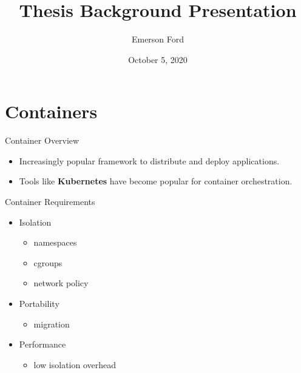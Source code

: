 \documentclass{beamer}
\title{Thesis Background Presentation}
\date{October 5, 2020}
\author{Emerson Ford}
\institute{University of Utah School of Computing}
\begin{document}
\maketitle

\section{Containers}

\begin{frame}{Container Overview}
    \begin{itemize}
        \item Increasingly popular framework to distribute and deploy applications.
        \item Tools like \textbf{Kubernetes} have become popular for container orchestration.
    \end{itemize}
\end{frame}

\begin{frame}{Container Requirements}
    \begin{itemize}
        \item Isolation
            \begin{itemize}
                \item namespaces
                \item cgroups
                \item network policy
            \end{itemize}
        \item Portability
            \begin{itemize}
                \item migration
            \end{itemize}
        \item Performance
            \begin{itemize}
                \item low isolation overhead
            \end{itemize}
    \end{itemize}
\end{frame}
\end{document}
